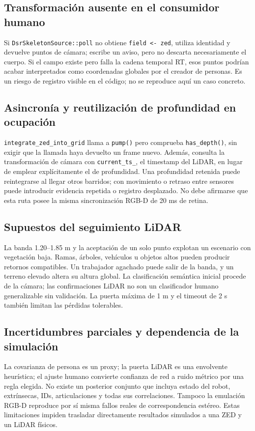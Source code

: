 \documentclass[11pt,a4paper]{article}
\newcommand{\code}[1]{\nolinkurl{#1}}
\begin{document}
\subsection{Transformación ausente en el consumidor humano}
Si \code{DsrSkeletonSource::poll} no obtiene \code{field <- zed}, utiliza identidad
y devuelve puntos de cámara; escribe un aviso, pero no descarta necesariamente el
cuerpo. Si el campo existe pero falla la cadena temporal RT, esos puntos podrían
acabar interpretados como coordenadas globales por el creador de personas. Es un
riesgo de registro visible en el código; no se reproduce aquí un caso concreto.
\cite{skeletonsource,humangraph,humanworker}

\subsection{Asincronía y reutilización de profundidad en ocupación}
\code{integrate_zed_into_grid} llama a \code{pump()} pero comprueba
\code{has_depth()}, sin exigir que la llamada haya devuelto un frame nuevo. Además,
consulta la transformación de cámara con \code{current_ts_}, el timestamp del
LiDAR, en lugar de emplear explícitamente el de profundidad. Una profundidad retenida
puede reintegrarse al llegar otros barridos; con movimiento o retraso entre sensores
puede introducir evidencia repetida o registro desplazado. No debe afirmarse que
esta ruta posee la misma sincronización RGB-D de 20 ms de retina.
\cite{resworker,reszed}

\subsection{Supuestos del seguimiento LiDAR}
La banda 1.20--1.85 m y la aceptación de un solo punto explotan un escenario con
vegetación baja. Ramas, árboles, vehículos u objetos altos pueden producir retornos
compatibles. Un trabajador agachado puede salir de la banda, y un terreno elevado
altera su altura global. La clasificación semántica inicial procede de la cámara;
las confirmaciones LiDAR no son un clasificador humano generalizable sin validación.
La puerta máxima de 1 m y el timeout de 2 s también limitan las pérdidas tolerables.
\cite{humanlidar,humanconfig,worlds}

\subsection{Incertidumbres parciales y dependencia de la simulación}
La covarianza de persona es un proxy; la puerta LiDAR es una envolvente heurística;
el ajuste humano convierte confianza de red a ruido métrico por una regla elegida.
No existe un posterior conjunto que incluya estado del robot, extrínsecas, IDs,
articulaciones y todas sus correlaciones. Tampoco la emulación RGB-D reproduce por
sí misma fallos reales de correspondencia estéreo. Estas limitaciones impiden
trasladar directamente resultados simulados a una ZED y un LiDAR físicos.
\cite{humangraph,humanlidar,vfe,zeddriver}
\end{document}
